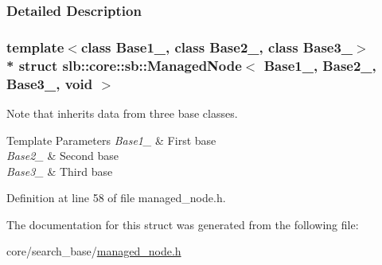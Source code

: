 \subsubsection{Detailed Description}
\subsubsection*{template$<$class Base1\+\_\+, class Base2\+\_\+, class Base3\+\_\+$>$\\*
struct slb\+::core\+::sb\+::\+Managed\+Node$<$ Base1\+\_\+, Base2\+\_\+, Base3\+\_\+, void $>$}

Note that inherits data from three base classes. 


\begin{DoxyTemplParams}{Template Parameters}
{\em Base1\+\_\+} & First base \\
\hline
{\em Base2\+\_\+} & Second base \\
\hline
{\em Base3\+\_\+} & Third base \\
\hline
\end{DoxyTemplParams}


Definition at line 58 of file managed\+\_\+node.\+h.



The documentation for this struct was generated from the following file\+:\begin{DoxyCompactItemize}
\item 
core/search\+\_\+base/\hyperlink{managed__node_8h}{managed\+\_\+node.\+h}\end{DoxyCompactItemize}

